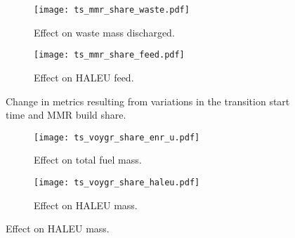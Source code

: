 \begin{figure}
    \ContinuedFloat
    \begin{subfigure}[b]{0.48\textwidth}
        \centering
        \texttt{[image: ts\_mmr\_share\_waste.pdf]}
        \caption{Effect on waste mass discharged.}
        \label{fig:ts_mmr_share_waste}
    \end{subfigure}
    \hfill
    \begin{subfigure}[b]{0.48\textwidth}
        \centering
        \texttt{[image: ts\_mmr\_share\_feed.pdf]}
        \caption{Effect on HALEU feed.}
        \label{fig:ts_mmr_share_feed}
    \end{subfigure}
    \caption{Change in metrics resulting from variations in the 
    transition start time and MMR build share.}
    \label{fig:ts_mmr_share}
\end{figure}

\begin{figure}
    \begin{subfigure}[b]{0.48\textwidth}
        \centering
        \texttt{[image: ts\_voygr\_share\_enr\_u.pdf]}
        \caption{Effect on total fuel mass.}
        \label{fig:ts_voygr_share_enr_u}
    \end{subfigure}
    \hfill
    \begin{subfigure}[b]{0.48\textwidth}
        \centering
        \texttt{[image: ts\_voygr\_share\_haleu.pdf]}
        \caption{Effect on HALEU mass.}
        \label{fig:ts_voygr_share_haleu}
    \end{subfigure}
\end{figure}

